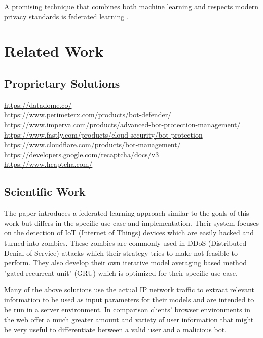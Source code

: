 \documentclass[
    fontsize=12pt,
    headings=small,
    parskip=half,           %
    bibliography=totoc,
    numbers=noenddot,       %
    open=any,               %
    final                   %
    ]{scrreprt}
\begin{document}

A promising technique that combines both machine learning and respects modern privacy standards is federated learning \cite{DBLP:journals/corr/KonecnyMR15} \cite{DBLP:journals/corr/KonecnyMRR16}.


\chapter{Related Work}

\section{Proprietary Solutions}

\url{https://datadome.co/} \\
\url{https://www.perimeterx.com/products/bot-defender/} \\
\url{https://www.imperva.com/products/advanced-bot-protection-management/} \\
\url{https://www.fastly.com/products/cloud-security/bot-protection} \\
\url{https://www.cloudflare.com/products/bot-management/} \\
\url{https://developers.google.com/recaptcha/docs/v3} \\
\url{https://www.hcaptcha.com/} \\


\section{Scientific Work}

The paper \cite{LiJi2021} introduces a federated learning approach similar to the goals of this work but differs in the specific use case and implementation. Their system focuses on the detection of IoT (Internet of Things) devices which are easily hacked and turned into zombies. These zombies are commonly used in DDoS (Distributed Denial of Service) attacks which their strategy tries to make not feasible to perform. They also develop their own iterative model averaging based method "gated recurrent unit" (GRU) which is optimized for their specific use case.


Many of the above solutions use the actual IP network traffic to extract relevant information to be used as input parameters for their models and are intended to be run in a server environment. In comparison clients' browser environments in the web offer a much greater amount and variety of user information that might be very useful to differentiate between a valid user and a malicious bot.
\end{document}
